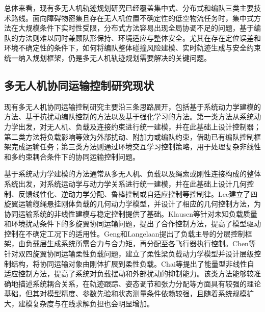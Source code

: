 总体来看，现有多无人机轨迹规划研究已经覆盖集中式、分布式和编队三类主要技术路线。面向障碍物密集且存在无人机位置不确定性的低空物流任务时，集中式方法在大规模条件下实时性受限，分布式方法容易出现全局协调不足的问题，基于编队的方法则难以同时兼顾队形保持、环境适应与整体安全。尤其在存在定位误差和环境不确定性的条件下，如何将编队整体碰撞风险建模、实时轨迹生成与安全约束统一纳入规划框架，仍是多无人机轨迹规划需要解决的关键问题。

\subsection{多无人机协同运输控制研究现状}

现有多无人机协同运输控制研究主要沿三条思路展开，包括基于系统动力学建模的方法、基于抗扰动编队控制的方法以及基于强化学习的方法\cite{XXYK202101006,KZYC202504002}。第一类方法从系统动力学出发，对无人机、负载及连接约束进行统一建模，并在此基础上设计控制器；第二类方法将负载影响等效为外部扰动、附加力或编队约束，借助已有编队控制框架完成运输任务；第三类方法则通过环境交互学习控制策略，用于处理复杂非线性和多约束耦合条件下的协同运输控制问题。

基于系统动力学建模的方法通常从多无人机、负载以及绳索或刚性连接构成的整体系统出发，对系统运动学与动力学关系进行统一建模，并在此基础上设计几何控制、反馈线性化、逆动力学分配、鲁棒控制或自适应控制等控制律。Lee建立了四旋翼运输缆绳悬挂刚体负载的几何动力学模型，并设计了相应的几何控制方法，为协同运输系统的非线性建模与稳定控制提供了基础\cite{lee2018geometric}。Klausen等针对未知负载质量和环境扰动条件下的多旋翼协同运输问题，提出了合作控制方法，提高了模型驱动控制在不确定工况下的适用性\cite{klausen2020cooperative}。Geng和Langelaan提出了负载主导的分层控制框架，由负载层生成系统所需合力与合力矩，再分配至各飞行器执行控制\cite{geng2020cooperative}。Chen等针对双四旋翼协同运输柔性负载问题，建立了柔性梁负载动力学模型并设计层级控制结构，将协同运输对象由刚体扩展到柔性负载\cite{chen2021cooperative}。Chai等提出了能量型非线性自适应控制方法，提高了系统对负载摆动和外部扰动的抑制能力\cite{chai2022energy}。该类方法能够较准确地描述系统耦合关系，在轨迹跟踪、姿态调节和张力分配等方面具有较强的理论基础，但其对模型精度、参数先验和状态测量条件依赖较强，且随着系统规模扩大，建模复杂度与在线求解负担也会明显增加。

